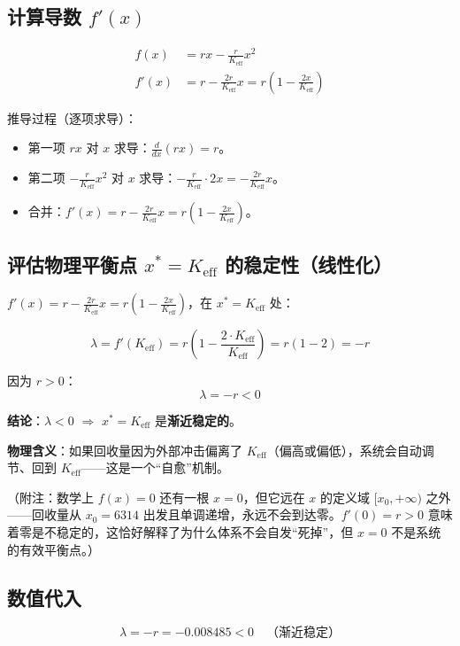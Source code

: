 \documentclass[12pt,a4paper]{article}
\begin{document}
\subsection{计算导数 $f'(x)$}

\begin{align*}
f(x) &= r x - \frac{r}{K_{\text{eff}}} x^2 \\[5pt]
f'(x) &= r - \frac{2r}{K_{\text{eff}}} x = r\left(1 - \frac{2x}{K_{\text{eff}}}\right)
\end{align*}

推导过程（逐项求导）：
\begin{itemize}
  \item 第一项 $r x$ 对 $x$ 求导：$\frac{d}{dx}(r x) = r$。
  \item 第二项 $-\frac{r}{K_{\text{eff}}} x^2$ 对 $x$ 求导：$-\frac{r}{K_{\text{eff}}} \cdot 2x = -\frac{2r}{K_{\text{eff}}}x$。
  \item 合并：$f'(x) = r - \frac{2r}{K_{\text{eff}}}x = r\left(1 - \frac{2x}{K_{\text{eff}}}\right)$。
\end{itemize}

\subsection{评估物理平衡点 $x^* = K_{\text{eff}}$ 的稳定性（线性化）}

$f'(x) = r - \frac{2r}{K_{\text{eff}}} x = r\left(1 - \frac{2x}{K_{\text{eff}}}\right)$，在 $x^* = K_{\text{eff}}$ 处：

\[
\lambda = f'(K_{\text{eff}}) = r\left(1 - \frac{2 \cdot K_{\text{eff}}}{K_{\text{eff}}}\right) = r(1 - 2) = -r
\]

因为 $r > 0$：
\[
\boxed{\lambda = -r < 0}
\]

\textbf{结论}：$\lambda < 0$ $\Rightarrow$ $x^* = K_{\text{eff}}$ 是\textbf{渐近稳定的}。

\textbf{物理含义}：如果回收量因为外部冲击偏离了 $K_{\text{eff}}$（偏高或偏低），系统会自动调节、回到 $K_{\text{eff}}$——这是一个``自愈''机制。

\medskip
{\small （附注：数学上 $f(x)=0$ 还有一根 $x=0$，但它远在 $x$ 的定义域 $[x_0, +\infty)$ 之外——回收量从 $x_0 = 6314$ 出发且单调递增，永远不会到达零。$f'(0)=r>0$ 意味着零是不稳定的，这恰好解释了为什么体系不会自发``死掉''，但 $x=0$ 不是系统的有效平衡点。）}

\subsection*{数值代入}
\[
\lambda = -r = -0.008485 < 0 \quad \text{（渐近稳定）}
\]
\end{document}
